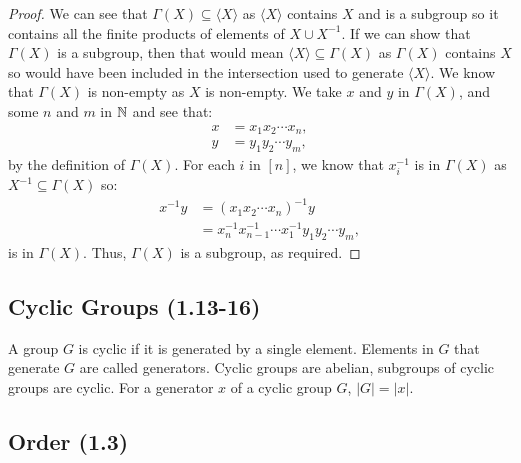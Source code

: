\begin{proof}
    We can see that $\Gamma(X) \subseteq \langle X \rangle$ as $\langle X \rangle$
    contains $X$ and is a subgroup so it contains all the finite products
    of elements of $X \cup X^{-1}$.
    If we can show that $\Gamma(X)$ is a subgroup, then that would mean
    $\langle X \rangle \subseteq \Gamma(X)$ as $\Gamma(X)$ contains $X$
    so would have been included in the intersection used to generate 
    $\langle X \rangle$. We know that $\Gamma(X)$ is non-empty as $X$ is
    non-empty. We take $x$ and $y$ in $\Gamma(X)$, and some $n$ and $m$ in $\mathbb{N}$
    and see that: \begin{align*}
        x &= x_1 x_2 \cdots x_n, \\
        y &= y_1 y_2 \cdots y_m, 
    \end{align*} by the definition of $\Gamma(X)$. For each $i$ in $[n]$, 
    we know that $x_i^{-1}$ is in $\Gamma(X)$ as 
    $X^{-1} \subseteq \Gamma(X)$ so: \begin{align*}
        x^{-1}y &= (x_1 x_2 \cdots x_n)^{-1}y \\
        &= x_n^{-1}x_{n - 1}^{-1} \cdots x_1^{-1} y_1 y_2 \cdots y_m,
    \end{align*} is in $\Gamma(X)$. Thus, $\Gamma(X)$
    is a subgroup, as required.
\end{proof}

\subsection{Cyclic Groups (1.13-16)} \label{1.13} \label{1.14} \label{1.16}

A group $G$ is cyclic if it is generated by a single element. Elements in
$G$ that generate $G$ are called generators. Cyclic groups are
abelian, subgroups of cyclic groups are cyclic. For a generator $x$
of a cyclic group $G$, $|G| = |x|$. 

\subsection{Order (1.3)} \label{1.3}

